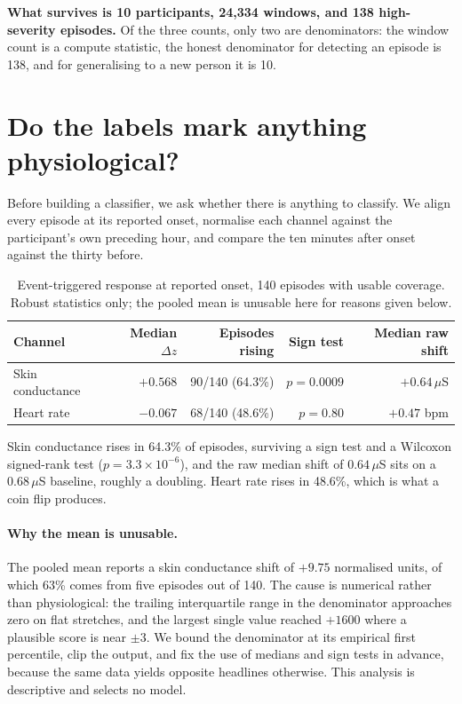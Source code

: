 \textbf{What survives is 10 participants, 24{,}334 windows, and 138
high-severity episodes.} Of the three counts, only two are denominators: the
window count is a compute statistic, the honest denominator for detecting an
episode is 138, and for generalising to a new person it is 10.

\section{Do the labels mark anything physiological?}
\label{sec:labels}

Before building a classifier, we ask whether there is anything to classify. We
align every episode at its reported onset, normalise each channel against the
participant's own preceding hour, and compare the ten minutes after onset
against the thirty before.

\begin{table}[t]
\caption{Event-triggered response at reported onset, 140 episodes with usable
coverage. Robust statistics only; the pooled mean is unusable here for reasons
given below.}
\label{tab:onset}
\centering
\begin{tabular}{lrrrr}
\toprule
Channel & Median $\Delta z$ & Episodes rising & Sign test & Median raw shift \\
\midrule
Skin conductance & $+0.568$ & 90/140 (64.3\%) & $p = 0.0009$ &
  $+0.64\,\mu$S \\
Heart rate & $-0.067$ & 68/140 (48.6\%) & $p = 0.80$ & $+0.47$ bpm \\
\bottomrule
\end{tabular}
\end{table}

Skin conductance rises in 64.3\% of episodes, surviving a sign test and a
Wilcoxon signed-rank test ($p = 3.3\times10^{-6}$), and the raw median shift of
$0.64\,\mu$S sits on a $0.68\,\mu$S baseline, roughly a doubling. Heart rate
rises in 48.6\%, which is what a coin flip produces.

\paragraph{Why the mean is unusable.} The pooled mean reports a skin
conductance shift of $+9.75$ normalised units, of which 63\% comes from five
episodes out of 140. The cause is numerical rather than physiological: the
trailing interquartile range in the denominator approaches zero on flat
stretches, and the largest single value reached $+1600$ where a plausible score
is near $\pm3$. We bound the denominator at its empirical first percentile,
clip the output, and fix the use of medians and sign tests in advance, because
the same data yields opposite headlines otherwise. This analysis is descriptive
and selects no model.

